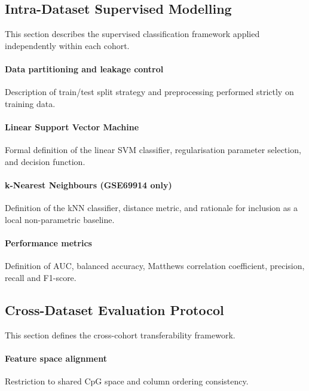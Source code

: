 \subsection{Intra-Dataset Supervised Modelling}

This section describes the supervised classification framework
applied independently within each cohort.

\paragraph{Data partitioning and leakage control}
Description of train/test split strategy and preprocessing
performed strictly on training data.

\paragraph{Linear Support Vector Machine}
Formal definition of the linear SVM classifier,
regularisation parameter selection,
and decision function.

\paragraph{k-Nearest Neighbours (GSE69914 only)}
Definition of the kNN classifier,
distance metric,
and rationale for inclusion as a local non-parametric baseline.

\paragraph{Performance metrics}
Definition of AUC, balanced accuracy,
Matthews correlation coefficient,
precision, recall and F1-score.

\subsection{Cross-Dataset Evaluation Protocol}

This section defines the cross-cohort transferability framework.

\paragraph{Feature space alignment}
Restriction to shared CpG space and column ordering consistency.

